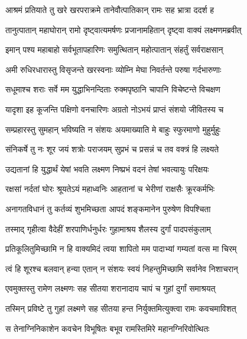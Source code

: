 
\twolineshloka
{आश्रमं प्रतियाते तु खरे खरपराक्रमे}
{तानेवौत्पातिकान् रामः सह भ्रात्रा ददर्श ह} %

\twolineshloka
{तानुत्पातान् महाघोरान् रामो दृष्ट्वात्यमर्षणः}
{प्रजानामहितान् दृष्ट्वा वाक्यं लक्ष्मणमब्रवीत्} %

\twolineshloka
{इमान् पश्य महाबाहो सर्वभूतापहारिणः}
{समुत्थितान् महोत्पातान् संहर्तुं सर्वराक्षसान्} %

\twolineshloka
{अमी रुधिरधारास्तु विसृजन्ते खरस्वनाः}
{व्योम्नि मेघा निवर्तन्ते परुषा गर्दभारुणाः} %

\twolineshloka
{सधूमाश्च शराः सर्वे मम युद्धाभिनन्दिताः}
{रुक्मपृष्ठानि चापानि विचेष्टन्ते विचक्षण} %

\twolineshloka
{यादृशा इह कूजन्ति पक्षिणो वनचारिणः}
{अग्रतो नोऽभयं प्राप्तं संशयो जीवितस्य च} %

\twolineshloka
{सम्प्रहारस्तु सुमहान् भविष्यति न संशयः}
{अयमाख्याति मे बाहुः स्फुरमाणो मुहुर्मुहुः} %

\twolineshloka
{संनिकर्षे तु नः शूर जयं शत्रोः पराजयम्}
{सुप्रभं च प्रसन्नं च तव वक्त्रं हि लक्ष्यते} %

\twolineshloka
{उद्यतानां हि युद्धार्थं येषां भवति लक्ष्मण}
{निष्प्रभं वदनं तेषां भवत्यायुः परिक्षयः} %

\twolineshloka
{रक्षसां नर्दतां घोरः श्रूयतेऽयं महाध्वनिः}
{आहतानां च भेरीणां राक्षसैः क्रूरकर्मभिः} %

\twolineshloka
{अनागतविधानं तु कर्तव्यं शुभमिच्छता}
{आपदं शङ्कमानेन पुरुषेण विपश्चिता} %

\twolineshloka
{तस्माद् गृहीत्वा वैदेहीं शरपाणिर्धनुर्धरः}
{गुहामाश्रय शैलस्य दुर्गां पादपसंकुलाम्} %

\twolineshloka
{प्रतिकूलितुमिच्छामि न हि वाक्यमिदं त्वया}
{शापितो मम पादाभ्यां गम्यतां वत्स मा चिरम्} %

\twolineshloka
{त्वं हि शूरश्च बलवान् हन्या एतान् न संशयः}
{स्वयं निहन्तुमिच्छामि सर्वानेव निशाचरान्} %

\twolineshloka
{एवमुक्तस्तु रामेण लक्ष्मणः सह सीतया}
{शरानादाय चापं च गुहां दुर्गां समाश्रयत्} %

\twolineshloka
{तस्मिन् प्रविष्टे तु गुहां लक्ष्मणे सह सीतया}
{हन्त निर्युक्तमित्युक्त्वा रामः कवचमाविशत्} %

\twolineshloka
{स तेनाग्निनिकाशेन कवचेन विभूषितः}
{बभूव रामस्तिमिरे महानग्निरिवोत्थितः} %

